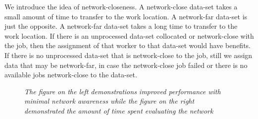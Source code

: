 \documentclass{rspublic}
\begin{document}
We introduce the idea of network-closeness.  A network-close data-set
takes a small amount of time to transfer to the work location.  A
network-far data-set is just the opposite.  A network-far data-set takes
a long time to transfer to the work location.  If there is an
unprocessed data-set collocated or network-close with the job, then the
assignment of that worker to that data-set would have benefits.  If
there is no unprocessed data-set that is network-close to the job, still
we assign data that may be network-far, in case the network-close job
failed or there is no available jobs network-close to the data-set.
\begin{center}
\begin{figure}
\caption{\textit{The figure on the left demonstrations improved
performance with minimal network awareness while the figure on the right
demonstrated the amount of time spent evaluating the network}}
\label{experiment2}
\end{figure}
\end{center}
\end{document}
